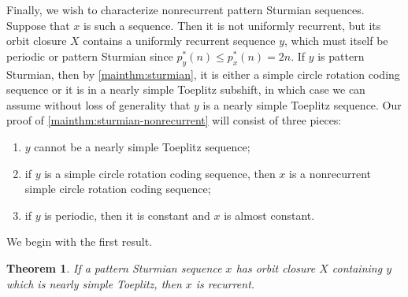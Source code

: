 \documentclass[11pt,reqno]{amsart}
\newtheorem{theorem}{Theorem}[section]
\theoremstyle{definition}
\theoremstyle{plain}
\newcommand{\AuthornoteA}[2]{{\sf\small\color{magenta}{[#1: #2]}}}
\newcommand{\Anote}{\AuthornoteA{A}}
\begin{document}
Finally, we wish to characterize nonrecurrent pattern Sturmian sequences. Suppose that $x$ is such a sequence. Then it is not uniformly recurrent, but its orbit closure $X$ contains a uniformly recurrent sequence $y$, which must itself be periodic or pattern Sturmian since $p^*_y(n) \leq p^*_x(n) = 2n$. 
If $y$ is pattern Sturmian, then by \cref{mainthm:sturmian}, it is either a simple circle rotation coding sequence or it is in a nearly simple Toeplitz subshift, in which case we can assume without loss of generality that $y$ is a nearly simple Toeplitz sequence. Our proof of \cref{mainthm:sturmian-nonrecurrent} will consist of three pieces: 

\begin{enumerate}
    \item $y$ cannot be a nearly simple Toeplitz sequence;
    
    \item if $y$ is a simple circle rotation coding sequence, then $x$ is a nonrecurrent simple circle rotation coding sequence;
    
    \item if $y$ is periodic, then it is constant and $x$ is almost constant.
\end{enumerate}

We begin with the first result.

\begin{theorem}\label{thm:contain_minimal_toeplitz_cannot}
    If a pattern Sturmian sequence $x$ has orbit closure $X$ containing $y$ which is nearly simple Toeplitz, then $x$ is recurrent.
\end{theorem}
\end{document}
